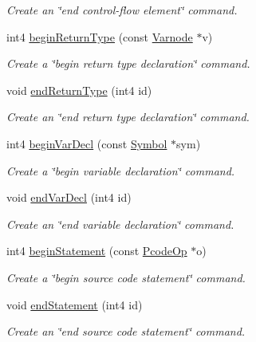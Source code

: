 \begin{DoxyCompactItemize}
\begin{DoxyCompactList}\small\item\em Create an \char`\"{}end control-\/flow element\char`\"{} command. \end{DoxyCompactList}\item 
int4 \mbox{\hyperlink{class_token_split_a2e4f04db795faf9a88e4e575744c65eb}{begin\+Return\+Type}} (const \mbox{\hyperlink{class_varnode}{Varnode}} $\ast$v)
\begin{DoxyCompactList}\small\item\em Create a \char`\"{}begin return type declaration\char`\"{} command. \end{DoxyCompactList}\item 
void \mbox{\hyperlink{class_token_split_a50c3b76f86a75f425879ceba2589b843}{end\+Return\+Type}} (int4 id)
\begin{DoxyCompactList}\small\item\em Create an \char`\"{}end return type declaration\char`\"{} command. \end{DoxyCompactList}\item 
int4 \mbox{\hyperlink{class_token_split_a45ce997b26f444d7ddb42e57693f2907}{begin\+Var\+Decl}} (const \mbox{\hyperlink{class_symbol}{Symbol}} $\ast$sym)
\begin{DoxyCompactList}\small\item\em Create a \char`\"{}begin variable declaration\char`\"{} command. \end{DoxyCompactList}\item 
void \mbox{\hyperlink{class_token_split_a6d5be5e7d3d58556488edb57a9ffb74e}{end\+Var\+Decl}} (int4 id)
\begin{DoxyCompactList}\small\item\em Create an \char`\"{}end variable declaration\char`\"{} command. \end{DoxyCompactList}\item 
int4 \mbox{\hyperlink{class_token_split_a09b86fe5f1a6f82681ae9b508969cf77}{begin\+Statement}} (const \mbox{\hyperlink{class_pcode_op}{Pcode\+Op}} $\ast$o)
\begin{DoxyCompactList}\small\item\em Create a \char`\"{}begin source code statement\char`\"{} command. \end{DoxyCompactList}\item 
void \mbox{\hyperlink{class_token_split_a33dd0d763dc8042bc3fca66fddff0b9b}{end\+Statement}} (int4 id)
\begin{DoxyCompactList}\small\item\em Create an \char`\"{}end source code statement\char`\"{} command. \end{DoxyCompactList}\item 

\end{DoxyCompactItemize}
